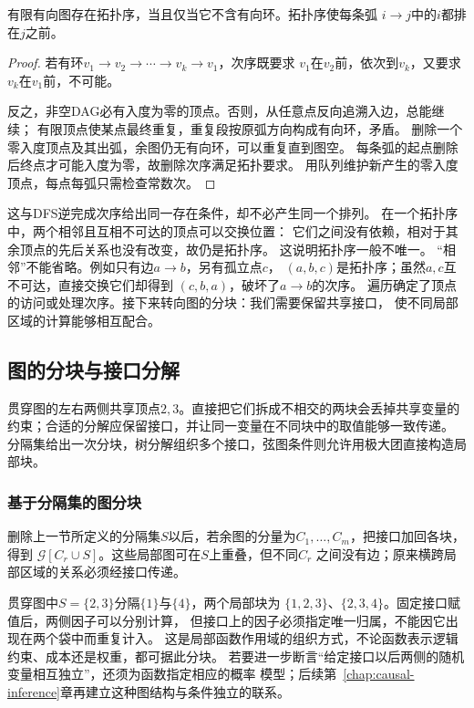 \begin{theorem}[DAG的拓扑排序]
  \label{thm:graph-theory-topological-order}
  有限有向图存在拓扑序，当且仅当它不含有向环。拓扑序使每条弧
  \(i\to j\)中的\(i\)都排在\(j\)之前。
\end{theorem}

\begin{proof}
若有环\(v_1\to v_2\to\cdots\to v_k\to v_1\)，次序既要求
\(v_1\)在\(v_2\)前，依次到\(v_k\)，又要求\(v_k\)在\(v_1\)前，不可能。

反之，非空DAG必有入度为零的顶点。否则，从任意点反向追溯入边，总能继续；
有限顶点使某点最终重复，重复段按原弧方向构成有向环，矛盾。
删除一个零入度顶点及其出弧，余图仍无有向环，可以重复直到图空。
每条弧的起点删除后终点才可能入度为零，故删除次序满足拓扑要求。
用队列维护新产生的零入度顶点，每点每弧只需检查常数次。
\end{proof}

这与DFS逆完成次序给出同一存在条件，却不必产生同一个排列。
在一个拓扑序中，两个相邻且互相不可达的顶点可以交换位置：
它们之间没有依赖，相对于其余顶点的先后关系也没有改变，故仍是拓扑序。
这说明拓扑序一般不唯一。
“相邻”不能省略。例如只有边\(a\to b\)，另有孤立点\(c\)，
\((a,b,c)\)是拓扑序；虽然\(a,c\)互不可达，直接交换它们却得到
\((c,b,a)\)，破坏了\(a\to b\)的次序。
遍历确定了顶点的访问或处理次序。接下来转向图的分块：我们需要保留共享接口，
使不同局部区域的计算能够相互配合。

\subsection{图的分块与接口分解}

贯穿图的左右两侧共享顶点\(2,3\)。直接把它们拆成不相交的两块会丢掉共享变量的
约束；合适的分解应保留接口，并让同一变量在不同块中的取值能够一致传递。
分隔集给出一次分块，树分解组织多个接口，弦图条件则允许用极大团直接构造局部块。

\subsubsection{基于分隔集的图分块}
\label{sec:graph-theory-separators}

删除上一节所定义的分隔集\(S\)以后，若余图的分量为\(C_1,\ldots,C_m\)，把接口加回各块，得到
\(\mathcal G[C_r\cup S]\)。这些局部图可在\(S\)上重叠，但不同\(C_r\)
之间没有边；原来横跨局部区域的关系必须经接口传递。

贯穿图中\(S=\{2,3\}\)分隔\(\{1\}\)与\(\{4\}\)，两个局部块为
\(\{1,2,3\}\)、\(\{2,3,4\}\)。固定接口赋值后，两侧因子可以分别计算，
但接口上的因子必须指定唯一归属，不能因它出现在两个袋中而重复计入。
这是局部函数作用域的组织方式，不论函数表示逻辑约束、成本还是权重，都可据此分块。
若要进一步断言“给定接口以后两侧的随机变量相互独立”，还须为函数指定相应的概率
模型；后续第~\ref{chap:causal-inference}章再建立这种图结构与条件独立的联系。

